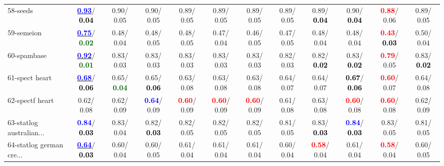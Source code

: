 \begin{table}[h]
\begin{center}
{\begin{tabular}{lc|c|c|c|c|c|c|c|c|c|c}
58-seeds & \underline{\textcolor{blue}{\textbf{  0.93}}}/\textcolor{black}{\textbf{  0.04}} &   0.90/  0.05 &   0.90/  0.05 &   0.89/  0.05 &   0.89/  0.05 &   0.89/  0.05 &   0.89/  0.05 &   0.89/\textcolor{black}{\textbf{  0.04}} &   0.90/\textcolor{black}{\textbf{  0.04}} & \textcolor{red}{\textbf{  0.88}}/  0.06 &   0.89/  0.05 \\
59-semeion & \underline{\textcolor{blue}{\textbf{  0.75}}}/\textcolor{darkgreen}{\textbf{  0.02}} &   0.48/  0.04 &   0.48/  0.05 &   0.48/  0.05 &   0.47/  0.04 &   0.46/  0.05 &   0.47/  0.05 &   0.48/  0.04 &   0.48/  0.04 & \textcolor{red}{\textbf{  0.43}}/\textcolor{black}{\textbf{  0.03}} &   0.50/  0.04 \\
60-spambase & \underline{\textcolor{blue}{\textbf{  0.92}}}/\textcolor{darkgreen}{\textbf{  0.01}} &   0.83/  0.03 &   0.83/  0.03 &   0.83/  0.03 &   0.83/  0.03 &   0.83/  0.03 &   0.82/  0.03 &   0.82/\textcolor{black}{\textbf{  0.02}} &   0.83/\textcolor{black}{\textbf{  0.02}} & \textcolor{red}{\textbf{  0.79}}/  0.05 &   0.83/\textcolor{black}{\textbf{  0.02}} \\ \hline
61-spect heart & \underline{\textcolor{blue}{\textbf{  0.68}}}/\textcolor{black}{\textbf{  0.06}} &   0.65/\textcolor{darkgreen}{\textbf{  0.04}} &   0.65/\textcolor{black}{\textbf{  0.06}} &   0.63/  0.08 &   0.63/  0.08 &   0.63/  0.08 &   0.64/  0.07 &   0.64/  0.07 & \textcolor{black}{\textbf{  0.67}}/\textcolor{black}{\textbf{  0.06}} & \textcolor{red}{\textbf{  0.60}}/  0.07 &   0.64/  0.08 \\
62-spectf heart &   0.62/  0.08 &   0.62/  0.09 & \textcolor{blue}{\textbf{  0.64}}/  0.09 & \textcolor{red}{\textbf{  0.60}}/  0.09 & \textcolor{red}{\textbf{  0.60}}/  0.09 & \textcolor{red}{\textbf{  0.60}}/  0.09 &   0.61/  0.08 &   0.63/  0.08 & \textcolor{red}{\textbf{  0.60}}/  0.08 & \textcolor{red}{\textbf{  0.60}}/  0.08 &   0.62/  0.09 \\
63-statlog australian... & \textcolor{blue}{\textbf{  0.84}}/\textcolor{black}{\textbf{  0.03}} &   0.83/  0.04 &   0.82/\textcolor{black}{\textbf{  0.03}} &   0.82/  0.05 &   0.82/  0.05 &   0.82/  0.05 &   0.81/  0.05 &   0.83/\textcolor{black}{\textbf{  0.03}} & \textcolor{blue}{\textbf{  0.84}}/\textcolor{black}{\textbf{  0.03}} &   0.83/  0.05 &   0.81/  0.05 \\
64-statlog german cre... & \underline{\textcolor{blue}{\textbf{  0.64}}}/\textcolor{black}{\textbf{  0.03}} &   0.60/  0.04 &   0.60/  0.05 &   0.61/  0.04 &   0.61/  0.04 &   0.61/  0.04 &   0.60/  0.04 & \textcolor{red}{\textbf{  0.58}}/  0.04 &   0.61/  0.04 & \textcolor{red}{\textbf{  0.58}}/  0.04 &   0.60/  0.05 \\\end{tabular}}\label{stratsBalAcc1aC4.5}
\end{center}
\end{table}
